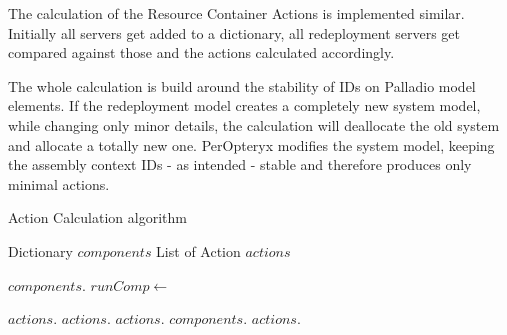 The calculation of the Resource Container Actions is implemented similar. Initially all servers get added to a dictionary, all redeployment servers get compared against those and the actions calculated accordingly.

The whole calculation is build around the stability of IDs on Palladio model elements. If the redeployment model creates a completely new system model, while changing only minor details, the calculation will deallocate the old system and allocate a totally new one. PerOpteryx modifies the system model, keeping the assembly context IDs - as intended - stable and therefore produces only minimal actions.

\begin{algorithm}[H]
	\caption{Action Calculation algorithm}
	\label{algo:action_calc}
	\begin{algorithmic}[1]
		
		\State Dictionary $components$
		\State List of Action $actions$
		\State
		
		\State
		$components.$
		\EndFor
		\EndProcedure
		\State
		\State
		\State
		\State
		$runComp\gets $ 
		
		 \State
		$actions.$
		\Else
		\State $actions.$
		\EndIf
		\State $actions.$
		\EndIf
		\EndIf
		\State $components.$
		\EndFor
		\State
		\State $actions.$
		\EndFor
		\EndProcedure
	\end{algorithmic}
\end{algorithm}



